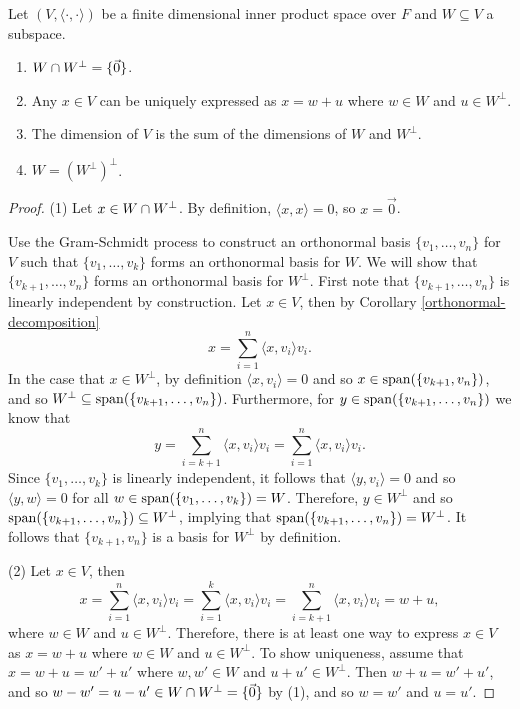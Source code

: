 \begin{thm}
    Let $(V, \langle\cdot,\cdot\rangle)$ be a finite dimensional inner product space over $F$ and $W \subseteq V$ a subspace.
    \begin{enumerate}
        \item $W \cap W^{\perp} = \{\vec{0}\}$.
        \item Any $x \in V$ can be uniquely expressed as $x = w + u$ where $w \in W$ and $u \in W^{\perp}$.
        \item The dimension of $V$ is the sum of the dimensions of $W$ and $W^{\perp}$.
        \item $W = \left(W^{\perp}\right)^{\perp}$.
    \end{enumerate}
\end{thm}

\begin{proof}\proofbreak
    (1) Let $x \in W \cap W^{\perp}$. By definition, $\langle x, x \rangle = 0$, so $x = \vec{0}$.

    Use the Gram-Schmidt process to construct an orthonormal basis $\{v_1, \ldots, v_n\}$ for $V$ such that $\{v_1, \ldots, v_k\}$ forms an orthonormal basis for $W$. We will show that $\{v_{k+1}, \ldots, v_n\}$ forms an orthonormal basis for $W^{\perp}$. First note that $\{v_{k+1}, \ldots, v_n\}$ is linearly independent by construction. Let $x \in V$, then by Corollary \ref{orthonormal-decomposition}
    \[x = \sum_{i=1}^{n}\langle x, v_i\rangle v_i.\] In the case that $x \in W^{\perp}$, by definition $\langle x, v_i\rangle = 0$ and so $x \in \operatorname{span}(\{v_{k+1}, v_n\})$, and so $W^{\perp} \subseteq \operatorname{span}(\{v_{k+1}, \ldots, v_n\})$. Furthermore, for $y \in \operatorname{span}(\{v_{k+1}, \ldots, v_n\})$ we know that \[y = \sum_{i={k+1}}^{n}\langle x, v_i\rangle v_i = \sum_{i=1}^{n}\langle x, v_i\rangle v_i.\] Since $\{v_1, \ldots, v_k\}$ is linearly independent, it follows that $\langle y, v_i \rangle = 0$ and so $\langle y, w \rangle = 0$ for all $w \in \operatorname{span}(\{v_1, \ldots, v_k\}) = W$. Therefore, $y \in W^{\perp}$ and so $\operatorname{span}(\{v_{k+1}, \ldots, v_n\}) \subseteq W^{\perp}$, implying that $\operatorname{span}(\{v_{k+1}, \ldots, v_n\}) = W^{\perp}$. It follows that $\{v_{k+1}, v_n\}$ is a basis for $W^{\perp}$ by definition.

    (2) Let $x \in V$, then \[x = \sum_{i=1}^{n}\langle x, v_i \rangle v_i = \sum_{i=1}^{k}\langle x, v_i \rangle v_i = \sum_{i={k+1}}^{n}\langle x, v_i \rangle v_i = w + u,\] where $w \in W$ and $u \in W^{\perp}$. Therefore, there is at least one way to express $x \in V$ as $x = w + u$ where $w \in W$ and $u \in W^{\perp}$. To show uniqueness, assume that $x = w + u = w' + u'$ where $w, w' \in W$ and $u + u' \in W^{\perp}$. Then $w + u = w' + u'$, and so $w - w' = u - u' \in W \cap W^{\perp} = \{\vec{0}\}$ by (1), and so $w = w'$ and $u = u'$.


\end{proof}
